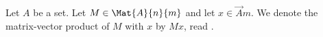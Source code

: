 



Let $A$ be a set.
Let $M \in \Mat{A}{n}{m}$ and let $x \in \Vec{A}{m}$. We denote the matrix-vector product of $M$ with $x$ by $Mx$, read .
